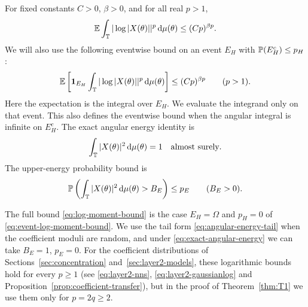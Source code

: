 \begin{namedhypothesis}\label{hyp:logenergy}
For fixed constants $C>0$, $\beta>0$, and for all real $p>1$,
\begin{equation}
 \mathbb E\int_{\mathbb T}|\log|X(\theta)||^p\,\mathrm d\mu(\theta)
       \leq(Cp)^{\beta p}. \label{eq:log-moment-bound}
\end{equation}
We will also use the following eventwise bound on an event
$E_H$ with $\mathbb P(E_H^c)\leq p_H$:
\begin{equation}
 \mathbb E\left[\boldsymbol1_{E_H}
       \int_{\mathbb T}|\log|X(\theta)||^p\,\mathrm d\mu(\theta)\right]
       \leq(Cp)^{\beta p}\qquad(p>1). \label{eq:event-log-moment-bound}
\end{equation}
Here the expectation is the integral over $E_H$. We evaluate the
integrand only on that event. This also defines the eventwise bound when the angular
integral is infinite on $E_H^c$.
The exact angular energy identity is
\begin{equation}
 \int_{\mathbb T}|X(\theta)|^2\,\mathrm d\mu(\theta)=1
       \quad\hbox{almost surely}. \label{eq:exact-angular-energy}
\end{equation}
The upper-energy probability bound is
\begin{equation}
 \mathbb P\left(\int_{\mathbb T}|X(\theta)|^2\,\mathrm d\mu(\theta)>B_E\right)
       \leq p_E \qquad(B_E>0). \label{eq:angular-energy-tail}
\end{equation}
\end{namedhypothesis}
The full bound \eqref{eq:log-moment-bound} is the case
$E_H=\Omega$ and $p_H=0$ of \eqref{eq:event-log-moment-bound}.
We use the tail form \eqref{eq:angular-energy-tail} when the coefficient
moduli are random, and under \eqref{eq:exact-angular-energy} we can take
$B_E=1$, $p_E=0$.
For the coefficient distributions of Sections~\ref{sec:concentration}
and~\ref{sec:layer2-models}, these logarithmic bounds hold for every
$p\ge1$ (see \eqref{eq:layer2-nns}, \eqref{eq:layer2-gaussianlog} and
Proposition~\ref{prop:coefficient-transfer}), but in the proof of
Theorem~\ref{thm:T1} we use them only for $p=2q\ge2$.

